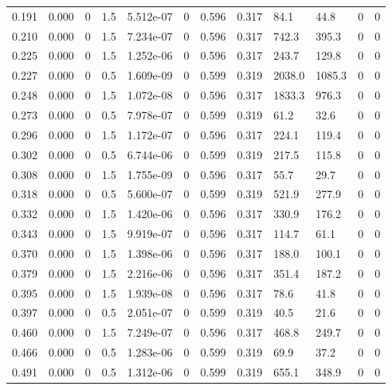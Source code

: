 \documentclass[preview]{standalone}
\begin{document}
{{\begin{tabular}{L{1.2cm}C{1.2cm} C{0.3cm}C{0.5cm} C{1.4cm}C{1.4cm} C{1.4cm}C{1.4cm} C{1.6cm}C{1.6cm} C{1.6cm}C{1.6cm}}
  0.191  &  0.000  & 0     & 1.5 &  5.512e-07  & 0  &  0.596&   0.317& 84.1 & 44.8   &  0 & 0  \\ 
  0.210  &  0.000  & 0     & 1.5 &  7.234e-07  & 0  &  0.596&   0.317& 742.3 & 395.3   &  0 & 0  \\ 
  0.225  &  0.000  & 0     & 1.5 &  1.252e-06  & 0  &  0.596&   0.317& 243.7 & 129.8   &  0 & 0  \\ 
  0.227  &  0.000  & 0     & 0.5 &  1.609e-09  & 0  &  0.599&   0.319& 2038.0 & 1085.3   &  0 & 0  \\ 
  0.248  &  0.000  & 0     & 1.5 &  1.072e-08  & 0  &  0.596&   0.317& 1833.3 & 976.3   &  0 & 0  \\ 
  0.273  &  0.000  & 0     & 0.5 &  7.978e-07  & 0  &  0.599&   0.319& 61.2 & 32.6   &  0 & 0  \\ 
  0.296  &  0.000  & 0     & 1.5 &  1.172e-07  & 0  &  0.596&   0.317& 224.1 & 119.4   &  0 & 0  \\ 
  0.302  &  0.000  & 0     & 0.5 &  6.744e-06  & 0  &  0.599&   0.319& 217.5 & 115.8   &  0 & 0  \\ 
  0.308  &  0.000  & 0     & 1.5 &  1.755e-09  & 0  &  0.596&   0.317& 55.7 & 29.7   &  0 & 0  \\ 
  0.318  &  0.000  & 0     & 0.5 &  5.600e-07  & 0  &  0.599&   0.319& 521.9 & 277.9   &  0 & 0  \\ 
  0.332  &  0.000  & 0     & 1.5 &  1.420e-06  & 0  &  0.596&   0.317& 330.9 & 176.2   &  0 & 0  \\ 
  0.343  &  0.000  & 0     & 1.5 &  9.919e-07  & 0  &  0.596&   0.317& 114.7 & 61.1   &  0 & 0  \\ 
  0.370  &  0.000  & 0     & 1.5 &  1.398e-06  & 0  &  0.596&   0.317& 188.0 & 100.1   &  0 & 0  \\ 
  0.379  &  0.000  & 0     & 1.5 &  2.216e-06  & 0  &  0.596&   0.317& 351.4 & 187.2   &  0 & 0  \\ 
  0.395  &  0.000  & 0     & 1.5 &  1.939e-08  & 0  &  0.596&   0.317& 78.6 & 41.8   &  0 & 0  \\ 
  0.397  &  0.000  & 0     & 0.5 &  2.051e-07  & 0  &  0.599&   0.319& 40.5 & 21.6   &  0 & 0  \\ 
  0.460  &  0.000  & 0     & 1.5 &  7.249e-07  & 0  &  0.596&   0.317& 468.8 & 249.7   &  0 & 0  \\ 
  0.466  &  0.000  & 0     & 0.5 &  1.283e-06  & 0  &  0.599&   0.319& 69.9 & 37.2   &  0 & 0  \\ 
  0.491  &  0.000  & 0     & 0.5 &  1.312e-06  & 0  &  0.599&   0.319& 655.1 & 348.9   &  0 & 0  \\ 

\end{tabular}}}
\end{document}
